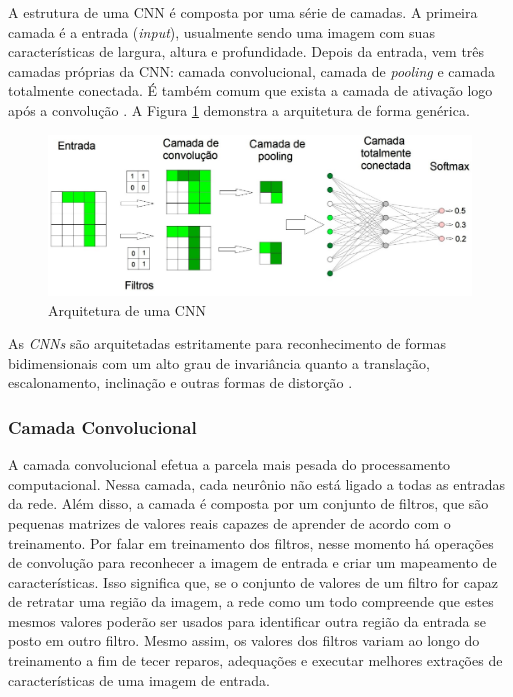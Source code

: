 A estrutura de uma CNN é composta por uma série de camadas. A primeira camada é a entrada (\textit{input}), usualmente sendo uma imagem com suas características de largura, altura e profundidade. Depois da entrada, vem três camadas próprias da CNN: camada convolucional, camada de \textit{pooling} e camada totalmente conectada. É também comum que exista a camada de ativação logo após a convolução  \cite{haykin2007redes}. A Figura \ref{fig:arch} demonstra a arquitetura de forma genérica.

\begin{figure}
    \centering
    \includegraphics[scale=0.25]{Relatorio/figuras/arch.png}
    \caption{Arquitetura de uma CNN \cite{eliveltoebermamrenatoa.krohling2018}}
    \label{fig:arch}
\end{figure}

As \textit{CNNs} são arquitetadas estritamente para reconhecimento de formas bidimensionais com um alto grau de invariância quanto a translação, escalonamento, inclinação e outras formas de distorção \cite{haykin2007redes}.

\subsubsection{Camada Convolucional}

A camada convolucional efetua a parcela mais pesada do processamento computacional. Nessa camada, cada neurônio não está ligado a todas as entradas da rede. Além disso, a camada é composta por um conjunto de filtros, que são pequenas matrizes de valores reais capazes de aprender de acordo com o treinamento. Por falar em treinamento dos filtros, nesse momento há operações de convolução para reconhecer a imagem de entrada e criar um mapeamento de características. Isso significa que, se o conjunto de valores de um filtro for capaz de retratar uma região da imagem, a rede como um todo compreende que estes mesmos valores poderão ser usados para identificar outra região da entrada se posto em outro filtro. Mesmo assim, os valores dos filtros variam ao longo do treinamento a fim de tecer reparos, adequações e executar melhores extrações de características de uma imagem de entrada.


